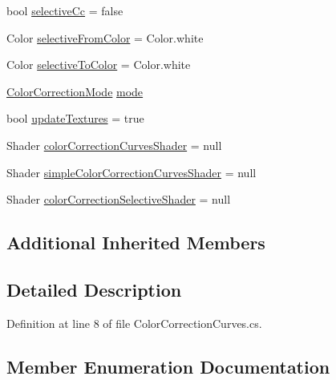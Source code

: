 \begin{DoxyCompactItemize}
bool \mbox{\hyperlink{class_unity_standard_assets_1_1_image_effects_1_1_color_correction_curves_a0f7d4c94911e7aca3c98f09572087e74}{selective\+Cc}} = false
\item 
Color \mbox{\hyperlink{class_unity_standard_assets_1_1_image_effects_1_1_color_correction_curves_a08100d03d76ce9135035e40c7fe37414}{selective\+From\+Color}} = Color.\+white
\item 
Color \mbox{\hyperlink{class_unity_standard_assets_1_1_image_effects_1_1_color_correction_curves_aaaf2f0df23c20d9045ec63368e59f176}{selective\+To\+Color}} = Color.\+white
\item 
\mbox{\hyperlink{class_unity_standard_assets_1_1_image_effects_1_1_color_correction_curves_a55501502c323a852330042c44d4530ad}{Color\+Correction\+Mode}} \mbox{\hyperlink{class_unity_standard_assets_1_1_image_effects_1_1_color_correction_curves_aadb7fb2fa0e4f1548eea3742a4c795ef}{mode}}
\item 
bool \mbox{\hyperlink{class_unity_standard_assets_1_1_image_effects_1_1_color_correction_curves_a884bb1061e32d3a5fab4d0c8441d94d8}{update\+Textures}} = true
\item 
Shader \mbox{\hyperlink{class_unity_standard_assets_1_1_image_effects_1_1_color_correction_curves_aef2fd5672e6e767d72f3403935b747de}{color\+Correction\+Curves\+Shader}} = null
\item 
Shader \mbox{\hyperlink{class_unity_standard_assets_1_1_image_effects_1_1_color_correction_curves_a9adea1c6642389514702ad46e870085a}{simple\+Color\+Correction\+Curves\+Shader}} = null
\item 
Shader \mbox{\hyperlink{class_unity_standard_assets_1_1_image_effects_1_1_color_correction_curves_a8ca932711d39b00d7ace42d6f416e1d7}{color\+Correction\+Selective\+Shader}} = null
\end{DoxyCompactItemize}
\subsection*{Additional Inherited Members}


\subsection{Detailed Description}


Definition at line 8 of file Color\+Correction\+Curves.\+cs.



\subsection{Member Enumeration Documentation}
\mbox{\label{class_unity_standard_assets_1_1_image_effects_1_1_color_correction_curves_a55501502c323a852330042c44d4530ad}} 
